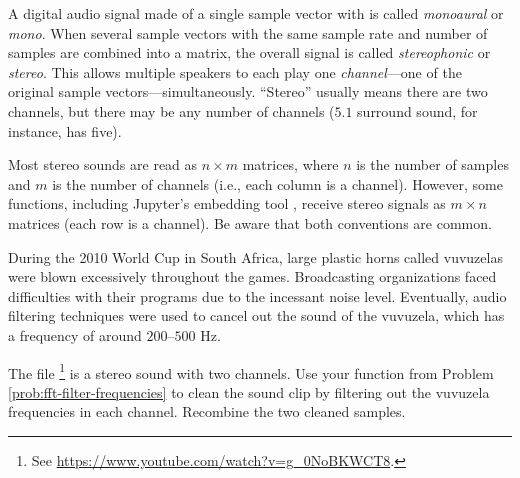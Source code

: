 A digital audio signal made of a single sample vector with is called \emph{monoaural} or \emph{mono}.
When several sample vectors with the same sample rate and number of samples are combined into a matrix, the overall signal is called \emph{stereophonic} or \emph{stereo}.
This allows multiple speakers to each play one \emph{channel}---one of the original sample vectors---simultaneously.
``Stereo'' usually means there are two channels, but there may be any number of channels ($5.1$ surround sound, for instance, has five).

Most stereo sounds are read as $n\times m$ matrices, where $n$ is the number of samples and $m$ is the number of channels (i.e., each column is a channel).
However, some functions, including Jupyter's embedding tool , receive stereo signals as $m\times n$ matrices (each row is a channel).
Be aware that both conventions are common.



\begin{problem}
\label{prob:fft-vuvuzelas}
During the 2010 World Cup in South Africa, large plastic horns called vuvuzelas were blown excessively throughout the games.
Broadcasting organizations faced difficulties with their programs due to the incessant noise level.
Eventually, audio filtering techniques were used to cancel out the sound of the vuvuzela, which has a frequency of around $200$--$500$ Hz.

The file \footnote{See \url{https://www.youtube.com/watch?v=g_0NoBKWCT8}.} is a stereo sound with two channels.
Use your function from Problem \ref{prob:fft-filter-frequencies} to clean the sound clip by filtering out the vuvuzela frequencies in each channel.
Recombine the two cleaned samples.
\end{problem}


